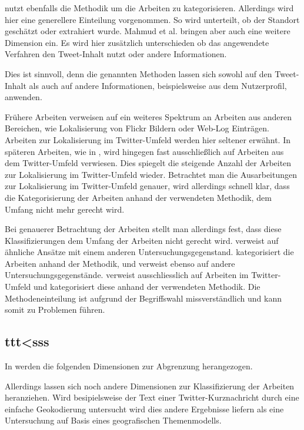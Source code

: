 		\cite{Mahmud2012} nutzt ebenfalls die Methodik um die Arbeiten zu kategorisieren. 
		Allerdings wird hier eine generellere Einteilung vorgenommen. 
		So wird unterteilt, ob der Standort geschätzt oder extrahiert wurde.  
		Mahmud et al. bringen aber auch eine weitere Dimension ein. 
		Es wird hier zusätzlich unterschieden ob das angewendete Verfahren den Tweet-Inhalt nutzt oder andere Informationen. 

		Dies ist sinnvoll, denn die genannten Methoden lassen sich sowohl auf den Tweet-Inhalt als auch auf andere Informationen, beispielsweise aus dem Nutzerprofil, anwenden. 
		
		Frühere Arbeiten verweisen auf ein weiteres Spektrum an Arbeiten aus anderen Bereichen, wie Lokalisierung von Flickr Bildern oder Web-Log Einträgen.
		Arbeiten zur Lokalisierung im Twitter-Umfeld werden hier seltener erwähnt. 
		In späteren Arbeiten, wie in \cite{Priedhorsky2013}, wird hingegen fast ausschließlich auf Arbeiten aus dem Twitter-Umfeld verwiesen. 
		Dies spiegelt die steigende Anzahl der Arbeiten zur Lokalisierung im Twitter-Umfeld wieder.
		Betrachtet man die Ausarbeitungen zur Lokalisierung im Twitter-Umfeld genauer, wird allerdings schnell klar, dass die Kategorisierung der Arbeiten anhand der verwendeten Methodik, dem Umfang nicht mehr gerecht wird. 

		
		
		Bei genauerer Betrachtung der Arbeiten stellt man allerdings fest, dass diese Klassifizierungen dem Umfang der Arbeiten nicht gerecht wird. 
		\cite{Hecht2011} verweist auf ähnliche Ansätze mit einem anderen Untersuchungsgegenstand.
		\cite{Cheng2010} kategorisiert die Arbeiten anhand der Methodik, und verweist ebenso auf andere Untersuchungsgegenstände. 
		\cite{Priedhorsky2013} verweist ausschliesslich auf Arbeiten im Twitter-Umfeld und kategorisiert diese anhand der verwendeten Methodik. 
		Die Methodeneinteilung ist aufgrund der Begriffswahl missverständlich und kann somit zu Problemen führen. 

		\subsection{ttt<sss}


		In \cite{Schulz2013} werden die folgenden Dimensionen zur Abgrenzung herangezogen.




		Allerdings lassen sich noch andere Dimensionen zur Klassifizierung der Arbeiten heranziehen. 
		Wird besipielsweise der Text einer Twitter-Kurznachricht durch eine einfache Geokodierung untersucht wird dies andere Ergebnisse liefern als eine Untersuchung auf Basis eines geografischen Themenmodells.  
		





